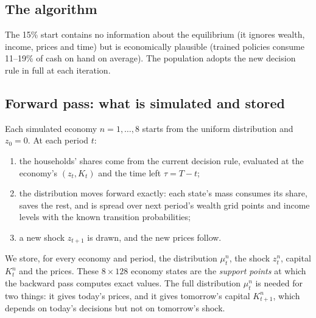 \documentclass[11pt,a4paper]{article}
\begin{document}
\subsection{The algorithm}
\begin{center}
\end{center}
The 15\% start contains no information about the equilibrium (it ignores wealth, income, prices and
time) but is economically plausible (trained policies consume 11--19\% of cash on hand on average).
The population adopts the new decision rule in full at each iteration.

\subsection{Forward pass: what is simulated and stored}\label{sec:forward}
Each simulated economy $n = 1,\ldots,8$ starts from the uniform distribution and $z_0 = 0$. At each
period $t$:
\begin{enumerate}
\item the households' shares come from the current decision rule, evaluated at the economy's
  $(z_t, K_t)$ and the time left $\tau = T - t$;
\item the distribution moves forward exactly: each state's mass consumes its share, saves the rest,
  and is spread over next period's wealth grid points and income levels with the known transition
  probabilities;
\item a new shock $z_{t+1}$ is drawn, and the new prices follow.
\end{enumerate}
We store, for every economy and period, the distribution $\mu_t^n$, the shock $z_t^n$, capital
$K_t^n$ and the prices. These $8 \times 128$ economy states are the \emph{support points} at which the
backward pass computes exact values. The full distribution $\mu_t^n$ is needed for two things: it
gives today's prices, and it gives tomorrow's capital $K_{t+1}^n$, which depends on today's
decisions but not on tomorrow's shock.
\end{document}
